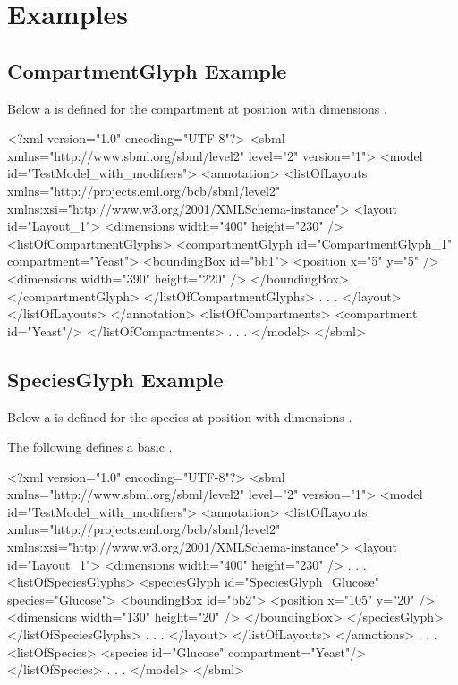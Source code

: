 
\section{Examples}
\label{examples}
\subsection{CompartmentGlyph Example}
Below a \CompartmentGlyph is defined for the compartment  at position  with dimensions .
 
\label{example:compartmentglyph}
\begin{example}
<?xml version="1.0" encoding="UTF-8"?>
<sbml xmlns="http://www.sbml.org/sbml/level2" level="2" version="1">
  <model id="TestModel_with_modifiers">
    <annotation>
     <listOfLayouts xmlns="http://projects.eml.org/bcb/sbml/level2"
              xmlns:xsi="http://www.w3.org/2001/XMLSchema-instance">
      <layout id="Layout_1">
        <dimensions width="400" height="230" />
        <listOfCompartmentGlyphs>
          <compartmentGlyph id="CompartmentGlyph_1" compartment="Yeast">
            <boundingBox id="bb1">
              <position x="5" y="5" />
              <dimensions width="390" height="220" />
            </boundingBox>
          </compartmentGlyph>
        </listOfCompartmentGlyphs>
                .
                .
                .
      </layout>
     </listOfLayouts>
    </annotation>
    <listOfCompartments>
      <compartment id="Yeast"/>
    </listOfCompartments>
        .
        .
        .
  </model>
</sbml>
\end{example}

\subsection{SpeciesGlyph Example}
Below a \SpeciesGlyph is defined for the species  at position  with dimensions .

The following defines a basic \SpeciesGlyph. 
\label{example:speciesglyph}
\begin{example}
<?xml version="1.0" encoding="UTF-8"?>
<sbml xmlns="http://www.sbml.org/sbml/level2" level="2" version="1">
  <model id="TestModel_with_modifiers">
    <annotation>
     <listOfLayouts xmlns="http://projects.eml.org/bcb/sbml/level2"
              xmlns:xsi="http://www.w3.org/2001/XMLSchema-instance">
      <layout id="Layout_1">
        <dimensions width="400" height="230" />
                .
                .
                .
        <listOfSpeciesGlyphs>
          <speciesGlyph id="SpeciesGlyph_Glucose" species="Glucose">
            <boundingBox id="bb2">
              <position x="105" y="20" />
              <dimensions width="130" height="20" />
            </boundingBox>
          </speciesGlyph>
        </listOfSpeciesGlyphs>  
            .
            .
            . 
       </layout>
      </listOfLayouts>
    </annotions>
         .
         .
         .
    <listOfSpecies>
      <species id="Glucose" compartment="Yeast"/>
    </listOfSpecies>
       .
       .
       .  
  </model>
</sbml>
\end{example}


